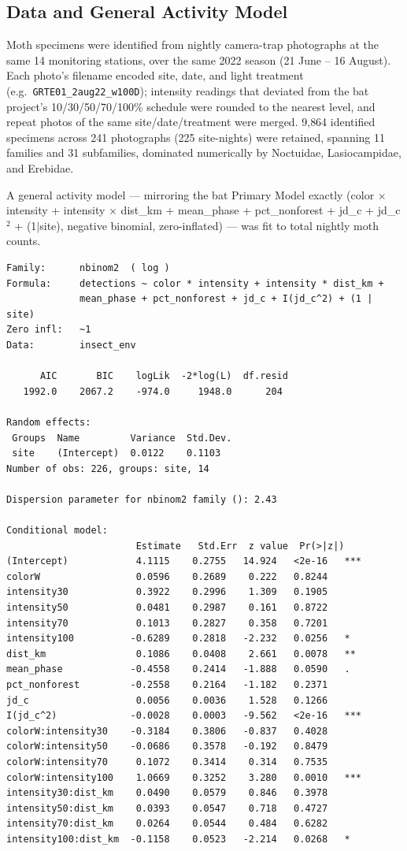 \documentclass[11pt, letterpaper]{article}
\begin{document}
\subsection{Data and General Activity Model}

Moth specimens were identified from nightly camera-trap photographs at
the same 14 monitoring stations, over the same 2022 season (21 June --
16 August). Each photo's filename encoded site, date, and light
treatment (e.g.\ \texttt{GRTE01\_2aug22\_w100D}); intensity readings
that deviated from the bat project's 10/30/50/70/100\% schedule were
rounded to the nearest level, and repeat photos of the same
site/date/treatment were merged. 9{,}864 identified specimens across
241 photographs (225 site-nights) were retained, spanning 11 families
and 31 subfamilies, dominated numerically by Noctuidae, Lasiocampidae,
and Erebidae.

A general activity model --- mirroring the bat Primary Model exactly
(color $\times$ intensity + intensity $\times$ dist\_km + mean\_phase +
pct\_nonforest + jd\_c + jd\_c$^2$ + (1$\vert$site), negative binomial,
zero-inflated) --- was fit to total nightly moth counts.

\begin{verbatim}
Family:      nbinom2  ( log )
Formula:     detections ~ color * intensity + intensity * dist_km +
             mean_phase + pct_nonforest + jd_c + I(jd_c^2) + (1 | site)
Zero infl:   ~1
Data:        insect_env

      AIC       BIC    logLik  -2*log(L)  df.resid
   1992.0    2067.2    -974.0     1948.0      204

Random effects:
 Groups  Name         Variance  Std.Dev.
 site    (Intercept)  0.0122    0.1103
Number of obs: 226, groups: site, 14

Dispersion parameter for nbinom2 family (): 2.43

Conditional model:
                       Estimate   Std.Err  z value  Pr(>|z|)
(Intercept)            4.1115    0.2755   14.924   <2e-16   ***
colorW                 0.0596    0.2689    0.222   0.8244
intensity30            0.3922    0.2996    1.309   0.1905
intensity50            0.0481    0.2987    0.161   0.8722
intensity70            0.1013    0.2827    0.358   0.7201
intensity100          -0.6289    0.2818   -2.232   0.0256   *
dist_km                0.1086    0.0408    2.661   0.0078   **
mean_phase            -0.4558    0.2414   -1.888   0.0590   .
pct_nonforest         -0.2558    0.2164   -1.182   0.2371
jd_c                   0.0056    0.0036    1.528   0.1266
I(jd_c^2)             -0.0028    0.0003   -9.562   <2e-16   ***
colorW:intensity30    -0.3184    0.3806   -0.837   0.4028
colorW:intensity50    -0.0686    0.3578   -0.192   0.8479
colorW:intensity70     0.1072    0.3414    0.314   0.7535
colorW:intensity100    1.0669    0.3252    3.280   0.0010   ***
intensity30:dist_km    0.0490    0.0579    0.846   0.3978
intensity50:dist_km    0.0393    0.0547    0.718   0.4727
intensity70:dist_km    0.0264    0.0544    0.484   0.6282
intensity100:dist_km  -0.1158    0.0523   -2.214   0.0268   *
\end{verbatim}
\end{document}
